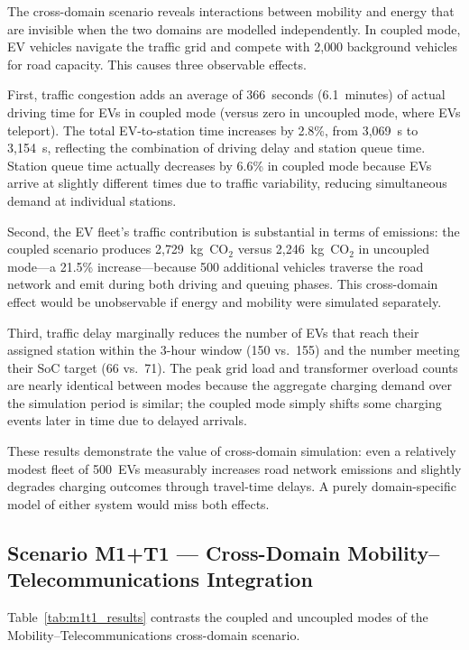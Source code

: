 The cross-domain scenario reveals interactions between mobility and energy that are invisible when the two domains are modelled independently. In coupled mode, EV vehicles navigate the traffic grid and compete with 2{,}000 background vehicles for road capacity. This causes three observable effects.

First, traffic congestion adds an average of 366~seconds (6.1~minutes) of actual driving time for EVs in coupled mode (versus zero in uncoupled mode, where EVs teleport). The total EV-to-station time increases by 2.8\%, from 3{,}069~s to 3{,}154~s, reflecting the combination of driving delay and station queue time. Station queue time actually decreases by 6.6\% in coupled mode because EVs arrive at slightly different times due to traffic variability, reducing simultaneous demand at individual stations.

Second, the EV fleet's traffic contribution is substantial in terms of emissions: the coupled scenario produces 2{,}729~kg~CO$_2$ versus 2{,}246~kg~CO$_2$ in uncoupled mode---a 21.5\% increase---because 500 additional vehicles traverse the road network and emit during both driving and queuing phases. This cross-domain effect would be unobservable if energy and mobility were simulated separately.

Third, traffic delay marginally reduces the number of EVs that reach their assigned station within the 3-hour window (150 vs.\ 155) and the number meeting their SoC target (66 vs.\ 71). The peak grid load and transformer overload counts are nearly identical between modes because the aggregate charging demand over the simulation period is similar; the coupled mode simply shifts some charging events later in time due to delayed arrivals.

These results demonstrate the value of cross-domain simulation: even a relatively modest fleet of 500~EVs measurably increases road network emissions and slightly degrades charging outcomes through travel-time delays. A purely domain-specific model of either system would miss both effects.

\subsection{Scenario M1+T1 --- Cross-Domain Mobility--Telecommunications Integration}

Table~\ref{tab:m1t1_results} contrasts the coupled and uncoupled modes of the Mobility--Telecommunications cross-domain scenario.

